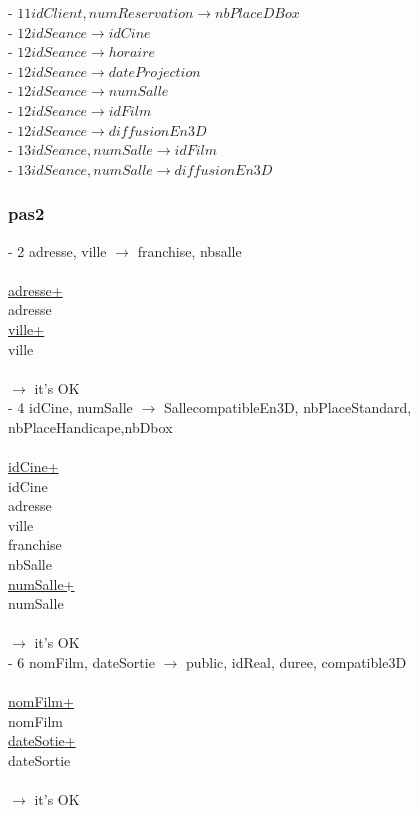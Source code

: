 \documentclass[a4paper,sffamily,12pt]{article}
\begin{document}
						- $11 idClient, numReservation \rightarrow nbPlaceDBox$ \\
						- $12 idSeance \rightarrow idCine$ \\
						- $12 idSeance \rightarrow horaire$ \\
						- $12 idSeance \rightarrow dateProjection$ \\
						- $12 idSeance \rightarrow numSalle$ \\
						- $12 idSeance \rightarrow idFilm$ \\
						- $12 idSeance \rightarrow diffusionEn3D$ \\
						- $ 13 idSeance, numSalle \rightarrow idFilm$ \\ 
						- $ 13 idSeance, numSalle \rightarrow diffusionEn3D$ \\
										
					\subsubsection{pas2}
		
						\noindent - 2 adresse, ville $\rightarrow$ franchise, nbsalle \\
							\\
							\underline{adresse+} \\
							adresse \\
							\underline{ville+} \\
							ville \\
							\\
						$\rightarrow$ it's OK \\
		
						\noindent - 4 idCine, numSalle $\rightarrow$ SallecompatibleEn3D, nbPlaceStandard, nbPlaceHandicape,nbDbox \\
							\\
							\underline{idCine+} \\
							idCine \\
							adresse \\
							ville \\
							franchise \\
							nbSalle \\
							\underline{numSalle+} \\
							numSalle \\
							\\
						$\rightarrow$ it's OK \\
						
						\noindent - 6 nomFilm, dateSortie $\rightarrow$ public, idReal, duree, compatible3D \\																						\\
							\underline{nomFilm+} \\
							nomFilm \\
							\underline{dateSotie+} \\
							dateSortie \\
							\\
						$\rightarrow$ it's OK \\
					
\end{document}
